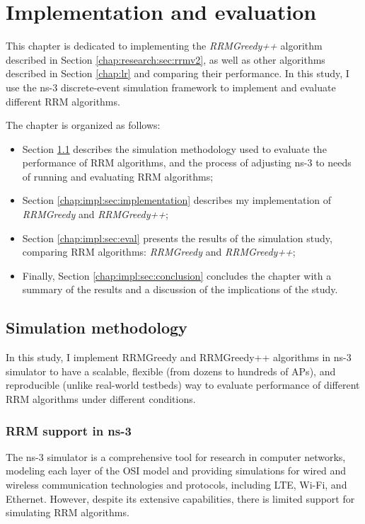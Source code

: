 \chapter{Implementation and evaluation}
\label{chap:impl}


This chapter is dedicated to implementing the \textit{RRMGreedy++} algorithm described in Section \ref{chap:research:sec:rrmv2}, as well as other algorithms described in Section \ref{chap:lr} and comparing their performance. In this study, I use the ns-3 discrete-event simulation framework to implement and evaluate different RRM algorithms.

The chapter is organized as follows:
\begin{itemize}
    \item Section \ref{chap:impl:sec:simulation_method} describes the simulation methodology used to evaluate the performance of RRM algorithms, and the process of adjusting ns-3 to needs of running and evaluating RRM algorithms;
    \item Section \ref{chap:impl:sec:implementation} describes my implementation of \textit{RRMGreedy} and \textit{RRMGreedy++}; %
    \item Section \ref{chap:impl:sec:eval} presents the results of the simulation study, comparing RRM algorithms: \textit{RRMGreedy} and \textit{RRMGreedy++};%
    \item Finally, Section \ref{chap:impl:sec:conclusion} concludes the chapter with a summary of the results and a discussion of the implications of the study.

\end{itemize}

\section{Simulation methodology}
\label{chap:impl:sec:simulation_method}
In this study, I implement %
RRMGreedy and RRMGreedy++ algorithms in ns-3 simulator to have a scalable, flexible (from dozens to hundreds of APs), and reproducible (unlike real-world testbeds) way to evaluate performance of different RRM algorithms under different conditions.

\subsection{RRM support in ns-3}
The ns-3 simulator is a comprehensive tool for research in computer networks, modeling each layer of the OSI model and providing simulations for wired and wireless communication technologies and protocols, including LTE, Wi-Fi, and Ethernet. However, despite its extensive capabilities, there is limited support for simulating RRM algorithms.

